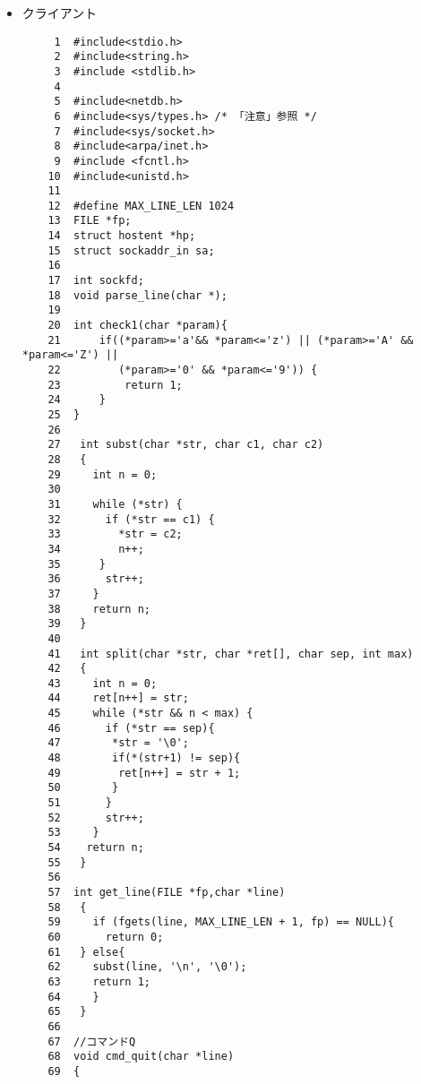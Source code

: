 \documentclass{jarticle}[11pt]
\begin{document}
\begin{itemize}
\begin{verbatim}
   586	        fprintf(stderr,"listen error\n");
   587	        close(sockfd);
   588	        return 1;
   589	    }
   590	   
   591	     while(1){
   592	        if((new_sockfd = accept(sockfd,(struct sockaddr*)&write_sa,&write_len))== -1) {
   593	            fprintf(stderr,"accept error\n");
   594	            return 1;
   595	        }
   596	        while(1){
   597	            recv(new_sockfd,recv_buf,1024,0);
   598	
   599	            //コマンドQの処理
   600	            if(recv_buf[0]=='%' && recv_buf[1]=='Q'){
   601	                sprintf(send_buf,"exit!");
   602	                send(new_sockfd,send_buf,1024,0);
   603	                close(new_sockfd);
   604	                break;
   605	            }
   606	
   607	            parse_line(recv_buf,new_sockfd);  
   608	        }
   609	     }
   610	}
\end{verbatim}
\item クライアント
\begin{verbatim}
     1	#include<stdio.h>
     2	#include<string.h>
     3	#include <stdlib.h>
     4	
     5	#include<netdb.h>
     6	#include<sys/types.h> /* 「注意」参照 */
     7	#include<sys/socket.h>
     8	#include<arpa/inet.h>
     9	#include <fcntl.h>
    10	#include<unistd.h>
    11	
    12	#define MAX_LINE_LEN 1024
    13	FILE *fp;
    14	struct hostent *hp;
    15	struct sockaddr_in sa;
    16	
    17	int sockfd;
    18	void parse_line(char *);
    19	
    20	int check1(char *param){
    21	    if((*param>='a'&& *param<='z') || (*param>='A' && *param<='Z') || 
    22	       (*param>='0' && *param<='9')) {
    23	        return 1;
    24	    }
    25	}
    26	
    27	 int subst(char *str, char c1, char c2)
    28	 {
    29	   int n = 0;
    30	 
    31	   while (*str) {
    32	     if (*str == c1) {
    33	       *str = c2;
    34	       n++;
    35	    }
    36	     str++;
    37	   }
    38	   return n;
    39	 }
    40	
    41	 int split(char *str, char *ret[], char sep, int max)
    42	 {
    43	   int n = 0;
    44	   ret[n++] = str; 
    45	   while (*str && n < max) {
    46	     if (*str == sep){
    47	      *str = '\0';
    48	      if(*(str+1) != sep){
    49	       ret[n++] = str + 1;
    50	      }
    51	     }
    52	     str++;
    53	   }
    54	  return n;
    55	 }
    56	
    57	int get_line(FILE *fp,char *line)
    58	 {
    59	   if (fgets(line, MAX_LINE_LEN + 1, fp) == NULL){
    60	     return 0;
    61	 } else{
    62	   subst(line, '\n', '\0');
    63	   return 1;
    64	   }
    65	 }
    66	
    67	//コマンドQ
    68	void cmd_quit(char *line)
    69	{

\end{verbatim}
\end{itemize}
\end{document}
